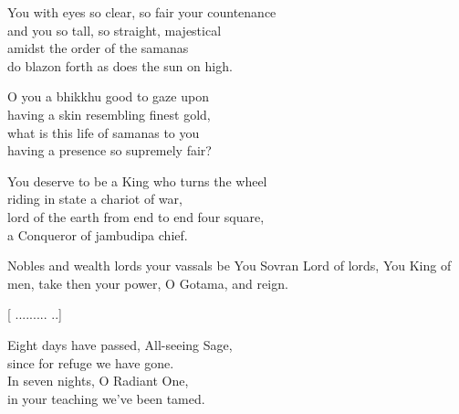 \begin{MyDescription}{}
You with eyes so clear, so fair your countenance\\
and you so tall, so straight, majestical\\
amidst the order of the samanas\\
do blazon forth as does the sun on high.
\end{MyDescription} 

\begin{MyDescription}{}
O you a bhikkhu good to gaze upon\\
having a skin resembling finest gold,\\
what is this life of samanas to you\\
having a presence so supremely fair?
\end{MyDescription} 

\begin{MyDescription}{}
You deserve to be a King who turns the wheel\\
riding in state a chariot of war,\\
lord of the earth from end to end four square,\\
a Conqueror of jambudipa chief.
\end{MyDescription} 

\begin{MyDescription}{}
Nobles and wealth lords your vassals be
You Sovran Lord of lords, You King of men,
take then your power, O Gotama, and reign.
\end{MyDescription} 

   [ ......... ..]


\begin{MyDescription}{}
Eight days have passed, All-seeing Sage,\\
since for refuge we have gone.\\
In seven nights, O Radiant One,\\
in your teaching we've been tamed.
\end{MyDescription} 

